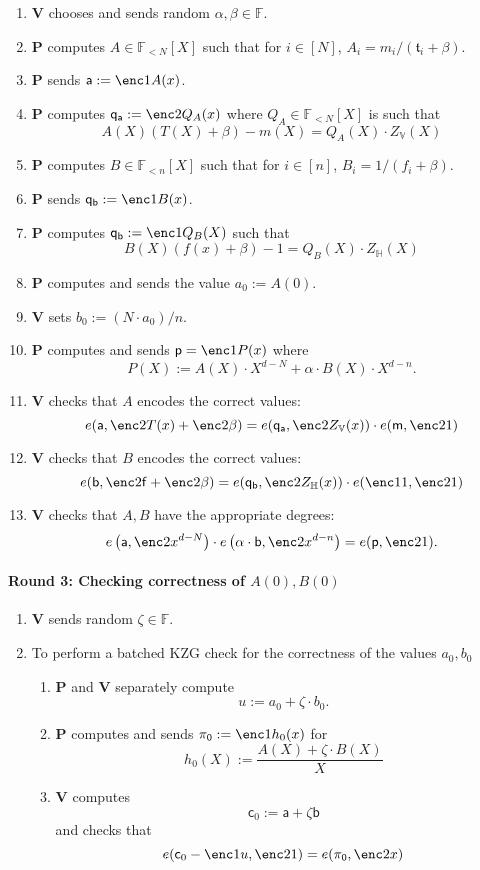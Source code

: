 \documentclass[11pt]{article} %
\newcommand{\F}{\ensuremath{\mathbb F}\xspace}
\newcommand{\defeq}{:=}
\newcommand{\prv}{\ensuremath{\mathsf{\mathbf{P}}}\xspace}
\newcommand{\ver}{\ensuremath{\mathsf{\mathbf{V}}}\xspace}
\newcommand{\polysofdeg}[1]{\ensuremath{\F_{< #1}[X]}\xspace}
\newcommand{\subspace}{\ensuremath{\mathbb{H}}\xspace}
\newcommand{\bigspace}{\ensuremath{\mathbb{V}}\xspace}
\newcommand{\witsize}{\ensuremath{n}\xspace}
\newcommand{\tabsize}{\ensuremath{N}\xspace}
\newcommand{\tab}{\ensuremath{\mathfrak{t}}\xspace}
\renewcommand{\a}{\ensuremath{\mathsf{a}}\xspace}
\renewcommand{\b}{\ensuremath{\mathsf{b}}\xspace}
\renewcommand{\c}{\ensuremath{\mathsf{c}}\xspace}
\newcommand{\f}{\ensuremath{\mathsf{f}}\xspace}
\renewcommand{\p}{\ensuremath{\mathsf{p}}\xspace}
\newcommand{\qa}{\ensuremath{\mathsf{q_a}}\xspace}
\newcommand{\qb}{\ensuremath{\mathsf{q_b}}\xspace}
\newcommand{\m}{\ensuremath{\mathsf{m}}\xspace}
\newcommand{\zerproof}{\ensuremath{\mathsf{\pi_0}}\xspace}
\begin{document}
\begin{enumerate}
 \item \ver chooses and sends random $\alpha,\beta \in \F$.
\item \prv computes $A\in \polysofdeg{\tabsize}$ such that for $i\in [\tabsize]$, $A_i = m_i/(\tab_i+\beta)$.
\item \prv sends $\a\defeq \enc1{A(x)}$.
\item\label{qstr-step:computeQA} \prv computes $\qa \defeq \enc2{Q_A(x)}$ where $Q_A\in \polysofdeg{\tabsize}$ is such that 
\[A(X)(T(X)+\beta)-m(X)= Q_A(X)\cdot Z_\bigspace(X)\]
\item \prv computes $B\in \polysofdeg{\witsize}$ such that for $i\in [\witsize]$, $B_i=1/(f_i+\beta)$.
\item \prv sends $\qb\defeq \enc1{B(x)}$.
\item \prv computes $\qb\defeq \enc1{Q_B(X)}$ such that 
\[B(X)(f(x)+\beta)-1 = Q_B(X)\cdot Z_\subspace(X)\]
\item \prv computes and sends the value $a_0\defeq A(0)$.
\item \ver  sets $b_0\defeq (\tabsize\cdot a_0)/\witsize$.
\item \prv computes and sends $\p=\enc1{P(x)}$ where
\[P(X)\defeq A(X)\cdot X^{d-\tabsize}+\alpha\cdot B(X)\cdot X^{d-\witsize}. \]
\item\label{qstr-step:checkqa} \ver checks that $A$ encodes the correct values:
\[e(\a,\enc2{T(x)}+\enc2{\beta} )=e(\qa,\enc2{Z_\bigspace(x)})\cdot e(\m,\enc2{1})\]
\item\label{qstr-step:checkqb} \ver checks that $B$ encodes the correct values:
\[e(\b,\enc2{\f}+\enc2{\beta} )=e(\qb,\enc2{Z_\subspace(x)})\cdot e(\enc1{1},\enc2{1})\]
\item\label{qstr-step:checkadeg} \ver checks that $A,B$ have the appropriate degrees:
\[e\left(\a,\enc2{x^{d-\tabsize}}\right)\cdot e\left(\alpha\cdot \b,\enc2{x^{d-\witsize}}\right)=e(\p,\enc2{1}).\]
 \end{enumerate}
	\paragraph{\textbf{Round 3: Checking correctness of $A(0),B(0)$}}
 \begin{enumerate}
\item \ver sends random $\zeta \in \F$.
\item To perform a batched KZG check for the correctness of the values  $a_0,b_0$
  \begin{enumerate}
   \item  \prv and \ver separately compute
   \[u\defeq a_0+\zeta \cdot b_0.\] 
   \item \prv computes and sends $\zerproof\defeq \enc1{h_0(x)}$ for 
   \[h_0(X)\defeq \frac{A(X)+\zeta\cdot B(X)}{X}\]
   \item\label{step:checkKZG2} \ver computes 
   \[\c_0 \defeq \a +\zeta \b\]
   and  checks that 
   \[e(\c_0-\enc1{u},\enc2{1})=e(\zerproof,\enc2{x})\]
  \end{enumerate}
\end{enumerate}
\end{document}
